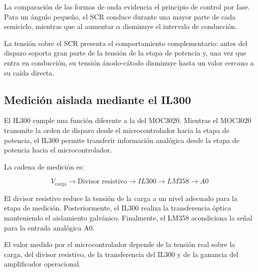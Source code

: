 \documentclass[12pt]{article}
\begin{document}
La comparación de las formas de onda evidencia el principio de control por fase. Para un ángulo pequeño, el SCR conduce durante una mayor parte de cada semiciclo, mientras que al aumentar $\alpha$ disminuye el intervalo de conducción.

La tensión sobre el SCR presenta el comportamiento complementario: antes del disparo soporta gran parte de la tensión de la etapa de potencia y, una vez que entra en conducción, su tensión ánodo-cátodo disminuye hasta un valor cercano a su caída directa.


\subsection{Medición aislada mediante el IL300}

El IL300 cumple una función diferente a la del MOC3020. Mientras el MOC3020 transmite la orden de disparo desde el microcontrolador hacia la etapa de potencia, el IL300 permite transferir información analógica desde la etapa de potencia hacia el microcontrolador.

La cadena de medición es:

\[
V_{\mathrm{carga}}
\rightarrow
\text{Divisor resistivo}
\rightarrow
IL300
\rightarrow
LM358
\rightarrow
A0
\]

El divisor resistivo reduce la tensión de la carga a un nivel adecuado para la etapa de medición. Posteriormente, el IL300 realiza la transferencia óptica manteniendo el aislamiento galvánico. Finalmente, el LM358 acondiciona la señal para la entrada analógica A0.

El valor medido por el microcontrolador depende de la tensión real sobre la carga, del divisor resistivo, de la transferencia del IL300 y de la ganancia del amplificador operacional.

\end{document}
